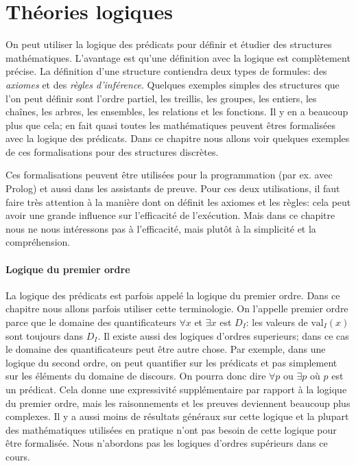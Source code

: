 {%

\chapter{Théories logiques}

On peut utiliser la logique des prédicats pour définir et étudier des structures mathématiques.
L'avantage est qu'une définition avec la logique est complètement précise.
La définition d'une structure contiendra deux types de formules:
des {\em axiomes} et des {\em règles d'inférence}.
Quelques exemples simples des structures que l'on peut définir sont
l'ordre partiel, les treillis, les groupes, les entiers, les chaînes, les arbres,
les ensembles, les relations et les fonctions.
Il y en a beaucoup plus que cela; en fait quasi toutes les mathématiques
peuvent êtres formalisées avec la logique des prédicats.
Dans ce chapitre nous allons voir quelques exemples de ces formalisations
pour des structures discrètes.

Ces formalisations peuvent être utilisées pour la programmation (par ex. avec Prolog)
et aussi dans les assistants de preuve.
Pour ces deux utilisations, il faut faire très attention à la manière dont on définit
les axiomes et les règles: cela peut avoir une grande influence sur l'efficacité de
l'exécution.
Mais dans ce chapitre nous ne nous intéressons pas à l'efficacité, mais plutôt à
la simplicité et la compréhension.

\subsubsection{Logique du premier ordre}

La logique des prédicats est parfois appelé la logique du premier ordre.
Dans ce chapitre nous allons parfois utiliser cette terminologie.
On l'appelle premier ordre parce que le domaine des quantificateurs $\forall x$ et $\exists x$
est $D_I$: les valeurs de $\mathrm{val}_I(x)$ sont toujours dans $D_I$.
Il existe aussi des logiques d'ordres superieurs; dans ce cas le domaine des quantificateurs
peut être autre chose.
Par exemple, dans une logique du second ordre, on peut quantifier sur les prédicats et pas
simplement sur les éléments du domaine de discours.
On pourra donc dire $\forall p$ ou $\exists p$ où $p$ est un prédicat.
Cela donne une expressivité supplémentaire par rapport à la logique du premier ordre,
mais les raisonnements et les preuves deviennent beaucoup plus complexes.
Il y a aussi moins de résultats généraux sur cette logique
et la plupart des mathématiques utilisées en pratique n'ont pas besoin de cette logique
pour être formalisée.
Nous n'abordons pas les logiques d'ordres supérieurs dans ce cours.

}
